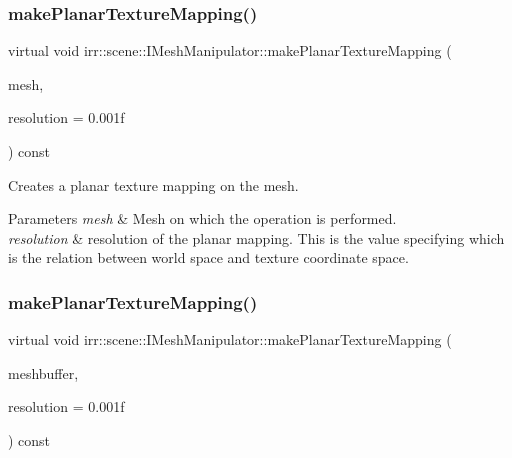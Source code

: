 \subsubsection{\texorpdfstring{make\+Planar\+Texture\+Mapping()}{makePlanarTextureMapping()}\hspace{0.1cm}{\footnotesize\ttfamily [2/8]}}
{\footnotesize\ttfamily virtual void irr\+::scene\+::\+I\+Mesh\+Manipulator\+::make\+Planar\+Texture\+Mapping (\begin{DoxyParamCaption}\item[{\hyperlink{classirr_1_1scene_1_1IMesh}{I\+Mesh} $\ast$}]{mesh,  }\item[{\hyperlink{namespaceirr_a0277be98d67dc26ff93b1a6a1d086b07}{f32}}]{resolution = {\ttfamily 0.001f} }\end{DoxyParamCaption}) const\hspace{0.3cm}{\ttfamily [pure virtual]}}



Creates a planar texture mapping on the mesh. 


\begin{DoxyParams}{Parameters}
{\em mesh} & Mesh on which the operation is performed. \\
\hline
{\em resolution} & resolution of the planar mapping. This is the value specifying which is the relation between world space and texture coordinate space. \\
\hline
\end{DoxyParams}
\mbox{\label{classirr_1_1scene_1_1IMeshManipulator_a757511833420a24ed8cbf4dfd6607143}} 
\subsubsection{\texorpdfstring{make\+Planar\+Texture\+Mapping()}{makePlanarTextureMapping()}\hspace{0.1cm}{\footnotesize\ttfamily [3/8]}}
{\footnotesize\ttfamily virtual void irr\+::scene\+::\+I\+Mesh\+Manipulator\+::make\+Planar\+Texture\+Mapping (\begin{DoxyParamCaption}\item[{\hyperlink{classirr_1_1scene_1_1IMeshBuffer}{scene\+::\+I\+Mesh\+Buffer} $\ast$}]{meshbuffer,  }\item[{\hyperlink{namespaceirr_a0277be98d67dc26ff93b1a6a1d086b07}{f32}}]{resolution = {\ttfamily 0.001f} }\end{DoxyParamCaption}) const\hspace{0.3cm}{\ttfamily [pure virtual]}}



